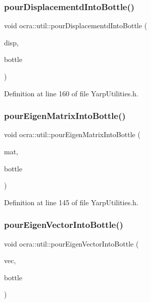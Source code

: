 \subsubsection{\texorpdfstring{pour\+Displacementd\+Into\+Bottle()}{pourDisplacementdIntoBottle()}}
{\footnotesize\ttfamily void ocra\+::util\+::pour\+Displacementd\+Into\+Bottle (\begin{DoxyParamCaption}\item[{const Eigen\+::\+Displacementd \&}]{disp,  }\item[{yarp\+::os\+::\+Bottle \&}]{bottle }\end{DoxyParamCaption})\hspace{0.3cm}{\ttfamily [inline]}}



Definition at line 160 of file Yarp\+Utilities.\+h.

\hypertarget{namespaceocra_1_1util_ac6e4695aa2be35591a1dc78eaf557c60}{}\label{namespaceocra_1_1util_ac6e4695aa2be35591a1dc78eaf557c60} 
\subsubsection{\texorpdfstring{pour\+Eigen\+Matrix\+Into\+Bottle()}{pourEigenMatrixIntoBottle()}}
{\footnotesize\ttfamily void ocra\+::util\+::pour\+Eigen\+Matrix\+Into\+Bottle (\begin{DoxyParamCaption}\item[{const Eigen\+::\+Matrix\+Xd \&}]{mat,  }\item[{yarp\+::os\+::\+Bottle \&}]{bottle }\end{DoxyParamCaption})\hspace{0.3cm}{\ttfamily [inline]}}



Definition at line 145 of file Yarp\+Utilities.\+h.

\hypertarget{namespaceocra_1_1util_a6010148e34dccf066481599d26c575c9}{}\label{namespaceocra_1_1util_a6010148e34dccf066481599d26c575c9} 
\subsubsection{\texorpdfstring{pour\+Eigen\+Vector\+Into\+Bottle()}{pourEigenVectorIntoBottle()}}
{\footnotesize\ttfamily void ocra\+::util\+::pour\+Eigen\+Vector\+Into\+Bottle (\begin{DoxyParamCaption}\item[{const Eigen\+::\+Vector\+Xd \&}]{vec,  }\item[{yarp\+::os\+::\+Bottle \&}]{bottle }\end{DoxyParamCaption})\hspace{0.3cm}{\ttfamily [inline]}}



